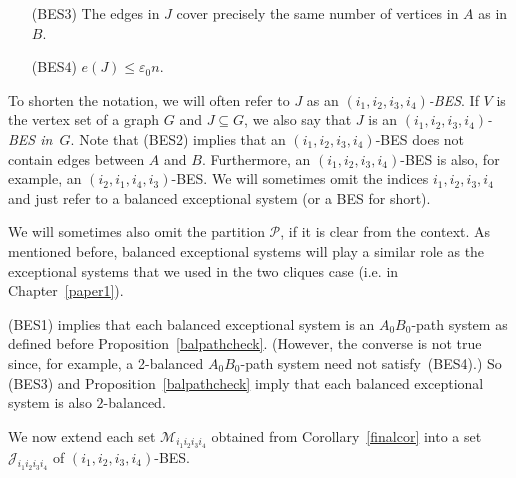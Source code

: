 \documentclass{memo-l}
\def\COMMENT#1{}
\def\cM{\mathcal{M}}
\def\cP{\mathcal{P}}
\def\eps{\varepsilon}
\def\i{(i_1,i_2,i_3,i_4)}
\numberwithin{section}{chapter}
\numberwithin{equation}{section}
\numberwithin{firstthm}{section}
\numberwithin{figure}{section}
\begin{document}
{\begin{itemize}
{}
\item[(BES$3$)] The edges in $J$ cover precisely the same number of vertices in $A$ as in $B$.%
   \COMMENT{Cannot write $J$ instead of "edges in $J$" here since we don't want to count the vertices of degree 0 which lie in $V(J)$.}
\item[(BES$4$)] $e(J)\le \eps_0 n$.
\end{itemize}
To shorten the notation, we will often refer to $J$ as an \emph{$(i_1,i_2, i_3,i_4)$-BES}.
If $V$ is the vertex set of a graph $G$ and $J\subseteq G$, we also say that $J$ is an \emph{$(i_1,i_2, i_3,i_4)$-BES in~$G$}. 
Note that (BES2) implies that an $(i_1,i_2, i_3,i_4)$-BES does not contain edges between $A$ and $B$.
Furthermore, an $\i$-BES is also, for example, an $(i_2,i_1, i_4,i_3)$-BES.
We will sometimes omit the indices $i_1,i_2, i_3,i_4$ and just refer to a balanced exceptional system (or a BES for short).%
   \COMMENT{Daniela deleted: Throughout the paper, usually our balanced exceptional systems will have parameter $\eps_0$,
so in this case we will often omit mentioning the parameter.}
We will sometimes also omit the partition $\cP$, if it is clear from the context. As mentioned before, balanced exceptional systems will
play a similar role as the exceptional systems that we used in the two cliques case (i.e. in Chapter~\ref{paper1}).

(BES1) implies that each balanced exceptional system is an $A_0B_0$-path system as defined before Proposition~\ref{balpathcheck}.
(However, the converse is not true since, for example, a 2-balanced $A_0B_0$-path system need not satisfy~(BES4).)
So (BES3) and Proposition~\ref{balpathcheck} imply that each balanced exceptional system is also $2$-balanced.

We now extend each set $\cM_{i_1i_2i_3i_4}$ obtained from Corollary~\ref{finalcor} into a set
$\mathcal{J}_{i_1i_2i_3i_4}$ of $(i_1,i_2,i_3,i_4)$-BES.

}
\end{document}
